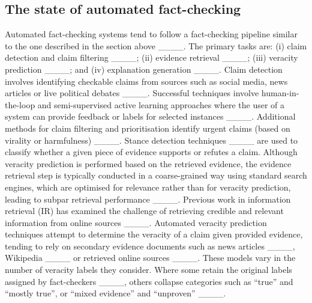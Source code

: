 \subsection{The state of automated fact-checking} \label{relwork:automated_FC}
Automated fact-checking systems tend to follow a fact-checking pipeline similar to the one described in the section above ____. The primary tasks are: 
(i) claim detection and claim filtering ____; 
(ii) evidence retrieval ____;
(iii) veracity prediction ____; and (iv) explanation generation ____.
Claim detection involves identifying checkable claims 
from sources such as social media, news articles or live political debates ____. 
Successful techniques involve human-in-the-loop and semi-supervised active learning approaches where the user of a system can provide feedback or labels for selected instances ____. Additional methods for claim filtering and prioritisation identify urgent claims (based on virality or harmfulness) ____.
Stance detection techniques ____ are used to classify whether a given piece of evidence supports or refutes a claim. 
Although veracity prediction is performed based on the retrieved evidence, the evidence retrieval step is typically conducted in a coarse-grained way using standard search engines, which are optimised for relevance rather than for veracity prediction, leading to subpar retrieval performance ____. Previous work in information retrieval (IR) has examined the challenge of retrieving credible and relevant information from online sources ____.
Automated veracity prediction techniques attempt to determine the veracity of a claim given provided evidence,
tending to rely on secondary evidence documents such as news articles ____, Wikipedia ____ or retrieved online sources ____.
These models vary in the number of veracity labels they consider. Where some retain the original labels assigned by fact-checkers ____, others collapse categories such as ``true'' and ``mostly true'', or ``mixed evidence'' and ``unproven'' ____.



